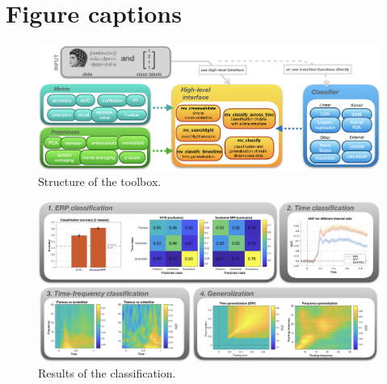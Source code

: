 \documentclass[utf8]{frontiersSCNS} %
\begin{document}
\section*{Figure captions}



\begin{figure}[ht!]
\centering\includegraphics[width=\linewidth]{fig1_MVPA_structure}
\caption{Structure of the toolbox.}\label{fig:structure}
\end{figure}

\begin{figure}[ht!]
\centering\includegraphics[width=\linewidth]{MVPA_results}
\caption{Results of the classification.}\label{fig:results}
\end{figure}
\end{document}
